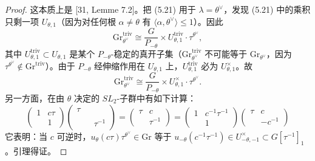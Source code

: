 \begin{proof}
这本质上是 [31, Lemme 7.2]。把 (5.21) 用于 $\lambda=\theta^\vee$，发现 (5.21) 中的乘积只剩一项 $U_{\theta,1}$（因为对任何根 $\alpha\neq\theta$ 有 $\langle\alpha,\theta^\vee\rangle\le 1$）。因此
\[
\mathrm{Gr}^{\mathrm{triv}}_{\theta^\vee}\cong\frac{G}{P_{-\theta}}\times U^{\mathrm{triv}}_{\theta,1}\cdot\tau^{\theta^\vee},
\]
其中 $U^{\mathrm{triv}}_{\theta,1}\subset U_{\theta,1}$ 是某个 $P_{-\theta}$-稳定的真开子集（$\mathrm{Gr}^{\mathrm{triv}}_{\theta^\vee}$ 不可能等于 $\mathrm{Gr}_{\theta^\vee}$，因为 $\tau^{\theta^\vee}\notin\mathrm{Gr}^{\mathrm{triv}}$）。由于 $P_{-\theta}$ 经伸缩作用在 $U_{\theta,1}$ 上，$U^{\mathrm{triv}}_{\theta,1}$ 必为 $U^\times_{\theta,1}$。故
\[
\mathrm{Gr}^{\mathrm{triv}}_{\theta^\vee}\cong\frac{G}{P_{-\theta}}\times U^\times_{\theta,1}\cdot\tau^{\theta^\vee}.
\]
另一方面，在由 $\theta$ 决定的 $SL_2$-子群中有如下计算：
\begin{equation}
\begin{pmatrix}1&c\tau\\&1\end{pmatrix}\begin{pmatrix}\tau&&\\&&\\&&\tau^{-1}\end{pmatrix}
=\begin{pmatrix}\tau&c\\&\tau^{-1}\end{pmatrix}
=\begin{pmatrix}1&c^{-1}\tau^{-1}\\&1\end{pmatrix}\begin{pmatrix}\tau&c\\&-c^{-1}\end{pmatrix}
\end{equation}
它表明：当 $c$ 可逆时，$u_\theta(c\tau)\tau^{\theta^\vee}\in\mathrm{Gr}$ 等于 $u_{-\theta}(c^{-1}\tau^{-1})\in U^\times_{-\theta,-1}\subset G[\tau^{-1}]_1$。引理得证。
\end{proof}

